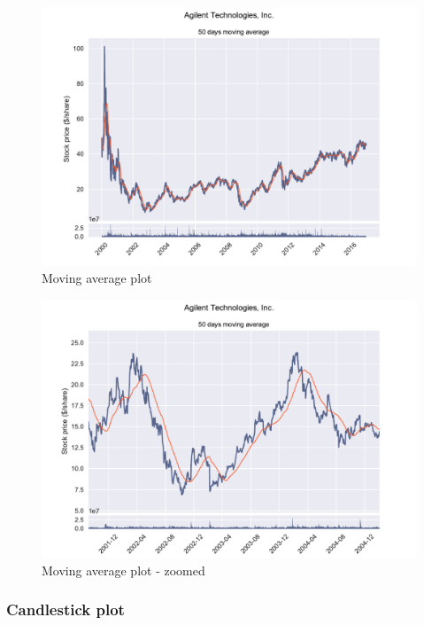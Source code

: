 \documentclass[12pt, a4paper]{article}
\begin{document}
\bgroup
  \inputminted[linenos, breaklines=true, fontsize=\scriptsize, firstnumber=last]{python}{src/stocks/simple/3_moving_avg.py}
  \label{listing:ssimp_3}
\egroup

\begin{figure}[H]
    \centering
    \includegraphics[width=\textwidth]{src/stocks/simple/movingavg}
    \caption{Moving average plot}
    \label{fig:stock_movingavg}
\end{figure}

\begin{figure}[H]
    \centering
    \includegraphics[width=\textwidth]{src/stocks/simple/movingavg_zoom}
    \caption{Moving average plot - zoomed}
    \label{fig:stock_movingavg_zoom}
\end{figure}

\subsubsection{Candlestick plot}
\end{document}
